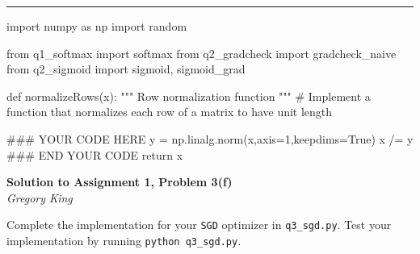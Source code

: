 \documentclass[letter,12pt]{article}
\newcommand{\myhwtitle}[3]
{\begin{center}
{\large {\bf Solution to Assignment {#1}, Problem {#2}}}\\
\medskip
{\it {#3}} %
\end{center}}
\newcommand{\solutionsAuthor}{Gregory King}
\begin{document}
\noindent\rule{\textwidth}{0.4pt}\vspace{5mm}
\begin{python}
import numpy as np
import random

from q1_softmax import softmax
from q2_gradcheck import gradcheck_naive
from q2_sigmoid import sigmoid, sigmoid_grad

def normalizeRows(x):
    """ Row normalization function """
    # Implement a function that normalizes each row of a matrix to have unit length

    ### YOUR CODE HERE
    y = np.linalg.norm(x,axis=1,keepdims=True)
    x /= y
    ### END YOUR CODE
    return x
\end{python}
\clearpage
\myhwtitle{1}{3(f)}{\solutionsAuthor}
\bigskip
\noindent Complete the implementation for your \texttt{SGD} optimizer in \texttt{q3\_sgd.py}. Test your implementation by running \texttt{python q3\_sgd.py}.
\end{document}
